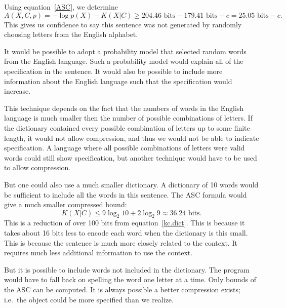 Using equation~\ref{ASC}, we determine
\begin{equation}
    A(X,C,p) = - \log p(X) - K(X|C) \geq 204.46 \mbox{ bits} - 179.41 \mbox{ bits} - c = 25.05 \mbox{ bits} - c \mbox{.}
\end{equation}
This gives us confidence to say this sentence was not generated by randomly choosing letters from the English alphabet.

It would be possible to adopt a probability model that selected random words from the English language.
Such a probability model would explain all of the specification in the sentence.
It would also be possible to include more information about the English language such that the specification would increase.

This technique depends on the fact that the numbers of words in the English language is much smaller then the number of possible combinations of letters.
If the dictionary contained every possible combination of letters up to some finite length, it would not allow compression, and thus we would not be able to indicate specification.
A language where all possible combinations of letters were valid words could still show specification, but another technique would have to be used to allow compression.

But one could also use a much smaller dictionary.
A dictionary of 10 words would be sufficient to include all the words in this sentence.
The ASC formula would give a much smaller compressed bound:
\begin{equation}
    K(X|C) \leq 9 \log_2 10 + 2 \log_2 9 \approx 36.24 \mbox{ bits.}
\end{equation}
This is a reduction of over 100 bits from equation~\ref{kc.dict}.
This is because it takes about 16 bits less to encode each word when the dictionary is this small.
This is because the sentence is much more closely related to the context.
It requires much less additional information to use the context.

But it is possible to include words not included in the dictionary.
The program would have to fall back on spelling the word one letter at a time.
Only bounds of the ASC can be computed.
It is always possible a better compression exists; i.e.\ the object could be more specified than we realize.

